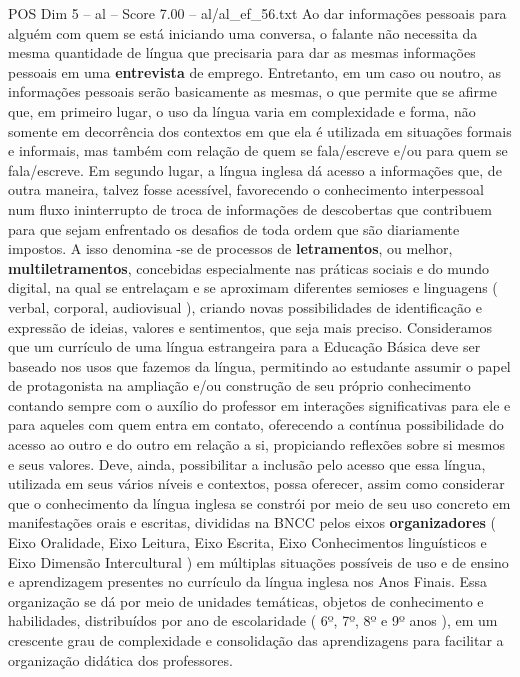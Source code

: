 \begin{textsample}{POS Dim 5 – al – Score 7.00 – al/al\_ef\_56.txt}
Ao dar informações pessoais para alguém com quem se está iniciando uma conversa, o falante não necessita da mesma quantidade de língua que precisaria para dar as mesmas informações pessoais em uma \textbf{entrevista} de emprego.
Entretanto, em um caso ou noutro, as informações pessoais serão basicamente as mesmas, o que permite que se afirme que, em primeiro lugar, o uso da língua varia em complexidade e forma, não somente em decorrência dos contextos em que ela é utilizada em situações formais e informais, mas também com relação de quem se fala/escreve e/ou para quem se fala/escreve.
Em segundo lugar, a língua inglesa dá acesso a informações que, de outra maneira, talvez fosse acessível, favorecendo o conhecimento interpessoal num fluxo ininterrupto de troca de informações de descobertas que contribuem para que sejam enfrentado os desafios de toda ordem que são diariamente impostos.
A isso denomina -se de processos de \textbf{letramentos}, ou melhor, \textbf{multiletramentos}, concebidas especialmente nas práticas sociais e do mundo digital, na qual se entrelaçam e se aproximam diferentes semioses e linguagens ( verbal, corporal, audiovisual ), criando novas possibilidades de identificação e expressão de ideias, valores e sentimentos, que seja mais preciso.
Consideramos que um currículo de uma língua estrangeira para a Educação Básica deve ser baseado nos usos que fazemos da língua, permitindo ao estudante assumir o papel de protagonista na ampliação e/ou construção de seu próprio conhecimento contando sempre com o auxílio do professor em interações significativas para ele e para aqueles com quem entra em contato, oferecendo a contínua possibilidade do acesso ao outro e do outro em relação a si, propiciando reflexões sobre si mesmos e seus valores.
Deve, ainda, possibilitar a inclusão pelo acesso que essa língua, utilizada em seus vários níveis e contextos, possa oferecer, assim como considerar que o conhecimento da língua inglesa se constrói por meio de seu uso concreto em manifestações orais e escritas, divididas na BNCC pelos eixos \textbf{organizadores} ( Eixo Oralidade, Eixo Leitura, Eixo Escrita, Eixo Conhecimentos linguísticos e Eixo Dimensão Intercultural ) em múltiplas situações possíveis de uso e de ensino e aprendizagem presentes no currículo da língua inglesa nos Anos Finais.
Essa organização se dá por meio de unidades temáticas, objetos de conhecimento e habilidades, distribuídos por ano de escolaridade ( 6º, 7º, 8º e 9º anos ), em um crescente grau de complexidade e consolidação das aprendizagens para facilitar a organização didática dos professores.

\end{textsample}
